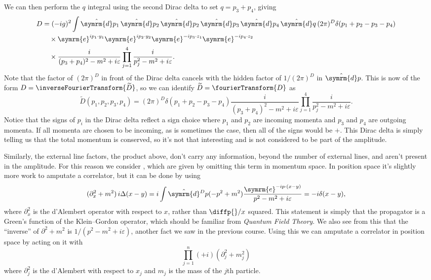 \documentclass[fleqn]{NotesClass}
\newcommand*{\course}[1]{\textit{#1}}
\newcommand{\e}{\symrm{e}}
\newcommand{\dhat}[1]{\hat{\symrm{d}}{#1}}
\newcommand{\dalembertian}{\partial^2}
\begin{document}
    We can then perform the \(q\) integral using the second Dirac delta to set \(q = p_3 + p_4\), giving
    \begin{align}
        D &= (-ig)^2 \int \dhat{p_1} \, \dhat{p_2} \, \dhat{p_2} \, \dhat{p_3} \, \dhat{p_4} \, \dhat{q} \, (2\pi)^D \delta(p_1 + p_2 - p_3 - p_4) \notag\\
        &\quad\times \e^{ip_1 \cdot y_1} \e^{ip_2 \cdot y_2}  \e^{-ip_3 \cdot z_1} \e^{-ip_4 \cdot z_2} \notag\\
        &\quad\times \frac{i}{(p_3 + p_4)^2 - m^2 + i\varepsilon} \prod_{j=1}^{4} \frac{i}{p_j^2 - m^2 + i\varepsilon}.
    \end{align}
    Note that the factor of \((2\pi)^D\) in front of the Dirac delta cancels with the hidden factor of \(1/(2\pi)^D\) in \(\dhat{p}\).
    This is now of the form \(D = \inverseFourierTransform\{\widetilde{D}\}\), so we can identify \(\widetilde{D} = \fourierTransform\{D\}\) as
    \begin{equation}
        \widetilde{D}(p_1, p_2, p_3, p_4) = (2\pi)^D\delta(p_1 + p_2 - p_3 - p_4) \frac{i}{(p_3 + p_4)^2 - m^2 + i\varepsilon} \prod_{j=1}^{4} \frac{i}{p_j^2 - m^2 + i\varepsilon}.
    \end{equation}
    Notice that the signs of \(p_i\) in the Dirac delta reflect a sign choice where \(p_1\) and \(p_2\) are incoming momenta and \(p_3\) and \(p_4\) are outgoing momenta.
    If all momenta are chosen to be incoming, as is sometimes the case, then all of the signs would be \(+\).
    This Dirac delta is simply telling us that the total momentum is conserved, so it's not that interesting and is not considered to be part of the amplitude.
    
    Similarly, the external line factors, the product above, don't carry any information, beyond the number of external lines, and aren't present in the amplitude.
    For this reason we consider , which are given by omitting this term in momentum space.
    In position space it's slightly more work to amputate a correlator, but it can be done by using
    \begin{equation}
        (\dalembertian_x + m^2) \, i\Delta(x - y) = i \int \dhat{^Dp} (-p^2 + m^2) \frac{\e^{-ip \cdot (x - y)}}{p^2 - m^2 + i\varepsilon} = -i\delta(x - y),
    \end{equation}
    where \(\dalembertian_x\) is the d'Alembert operator with respect to \(x\), rather than \(\diffp{}/{x}\) squared.
    This statement is simply that the propagator is a Green's function of the Klein--Gordon operator, which should be familiar from \course{Quantum Field Theory}.
    We also see from this that the \enquote{inverse} of \(\dalembertian + m^2\) is \(1/(p^2 - m^2 + i\varepsilon)\), another fact we saw in the previous course.
    Using this we can amputate a correlator in position space by acting on it with
    \begin{equation}
        \prod_{j=1}^{n} (+i)(\dalembertian_j + m_j^2)
    \end{equation}
    where \(\dalembertian_j\) is the d'Alembert with respect to \(x_j\) and \(m_j\) is the mass of the \(j\)th particle.
    
\end{document}
